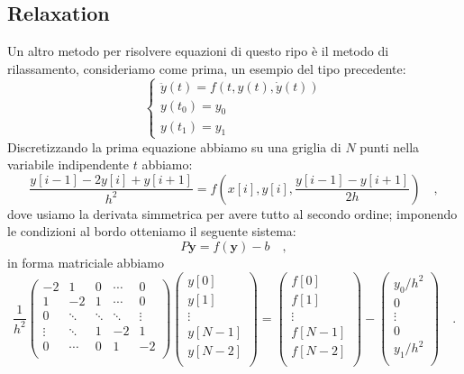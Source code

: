 \documentclass[10pt,a4paper]{article}
\begin{document}
\subsection{Relaxation}
Un altro metodo per risolvere equazioni di questo ripo è il metodo di rilassamento, consideriamo come prima, un esempio del tipo precedente:
\begin{equation}
\begin{cases}
\ddot{y}(t) = f(t, y(t), \dot{y}(t))\\
y(t_0)=y_0\\
y(t_1)=y_1
\end{cases}
\end{equation}
Discretizzando la prima equazione abbiamo su una griglia di $N$ punti nella variabile indipendente $t$ abbiamo:
\begin{equation}
\frac{y[i-1] - 2y[i] + y[i+1]}{h^2} = f(x[i], y[i], \frac{y[i-1] - y[i+1]}{2h} ) \quad,
\end{equation}
dove usiamo la derivata simmetrica per avere tutto al secondo ordine; imponendo le condizioni al bordo otteniamo il seguente sistema:
\begin{equation}
P \textbf{y} = f(\textbf{y}) - b \quad,
\end{equation}
in forma matriciale abbiamo
\begin{equation}
\frac{1}{h^2}
\begin{pmatrix}
-2 & 1  & 0 & \cdots &0\\
1  & -2 & 1 & \cdots &0\\
0 & \ddots & \ddots & \ddots &\vdots \\
\vdots & \ddots & 1 &  -2 & 1 \\
0 & \cdots &0&  1 & -2 \\
\end{pmatrix}
\begin{pmatrix}
y[0] \\
y[1] \\
\vdots \\
y[N-1] \\
y[N-2] \\
\end{pmatrix} = 
\begin{pmatrix}
f[0] \\
f[1] \\
\vdots \\
f[N-1] \\
f[N-2] \\
\end{pmatrix}-
\begin{pmatrix}
y_0/h^2 \\
0 \\
\vdots \\
0 \\
y_1/h^2 \\
\end{pmatrix} \quad.
\end{equation}
\end{document}
